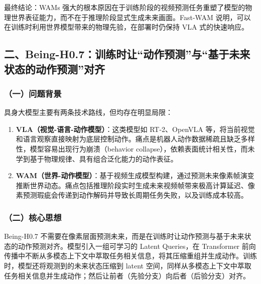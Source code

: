 最终结论：WAMs 强大的根本原因在于训练阶段的视频预测任务重塑了模型的物理世界表征能力，而不在于推理阶段显式生成未来画面。Fast-WAM 说明，可以在训练时利用世界模型带来的物理先验，在部署时仍保持 VLA 式的快速响应。

\hypertarget{ux4e8cbeing-h0.7ux8badux7ec3ux65f6ux8ba9ux52a8ux4f5cux9884ux6d4bux4e0eux57faux4e8eux672aux6765ux72b6ux6001ux7684ux52a8ux4f5cux9884ux6d4bux5bf9ux9f50}{%
\subsection{二、Being-H0.7：训练时让``动作预测''与``基于未来状态的动作预测''对齐}\label{ux4e8cbeing-h0.7ux8badux7ec3ux65f6ux8ba9ux52a8ux4f5cux9884ux6d4bux4e0eux57faux4e8eux672aux6765ux72b6ux6001ux7684ux52a8ux4f5cux9884ux6d4bux5bf9ux9f50}}

\hypertarget{ux4e00ux95eeux9898ux80ccux666f-23}{%
\subsubsection{（一）问题背景}\label{ux4e00ux95eeux9898ux80ccux666f-23}}

具身大模型主要有两条技术路线，但均存在明显局限：

\begin{enumerate}
\def\labelenumi{\arabic{enumi}.}
\tightlist
\item
  \textbf{VLA（视觉-语言-动作模型）}：这类模型如 RT-2、OpenVLA 等，将当前视觉和语言观察直接映射为底层控制动作。痛点是机器人动作数据稀疏且缺乏多样性，模型容易出现行为崩溃（behavior collapse），依赖表面统计相关性，而未学到基于物理规律、具有组合泛化能力的动作表征。
\item
  \textbf{WAM（世界-动作模型）}：基于视频生成模型构建，通过预测未来像素帧演变推断世界动态。痛点包括推理阶段实时生成未来视频帧带来极高计算延迟、像素预测瑕疵会传递到动作解码并导致长周期任务失败，以及训练成本较高。
\end{enumerate}

\hypertarget{ux4e8cux6838ux5fc3ux601dux60f3-8}{%
\subsubsection{（二）核心思想}\label{ux4e8cux6838ux5fc3ux601dux60f3-8}}

Being-H0.7 不需要在像素层面预测未来，而是在训练时让动作预测与基于未来状态的动作预测对齐。模型引入一组可学习的 Latent Queries，在 Transformer 前向传播中不断从多模态上下文中萃取任务相关信息，将其压缩重组并生成动作。训练时，模型还将观测到的未来状态压缩到 latent 空间，同样从多模态上下文中萃取任务相关信息并生成动作；然后让前者（先验分支）向后者（后验分支）对齐。

